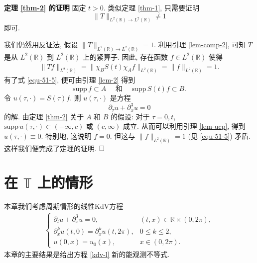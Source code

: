 \documentclass[master]{cugthesis}
\newcommand\R{\ensuremath{\mathbb{R}}}
\newcommand\T{\ensuremath{\mathbb{T}}}
\begin{document}
{\bf {定理 \ref{thm-2}} 的证明} 固定 $t>0$. 类似定理 \ref{thm-1}, 只需要证明 $$
\|T\|_{L^2(\R)\to L^2(\R)}\neq 1
$$
即可.

我们仍然用反证法, 假设 $\|T\|_{L^2(\R)\to L^2(\R)}= 1$. 利用引理 \ref{lem-comp-2}, 可知 $T$ 是从 $L^2(\R)$ 到 $L^2(\R)$ 上的紧算子. 因此, 存在函数 $f\in L^2(\R)$ 使得
\begin{align}\label{equ-51-5}
\|Tf\|_{L^2(\R)}=\|\chi_BS(t)\chi_Af\|_{L^2(\R)}=\|f\|_{L^2(\R)}=1.
\end{align}
有了式 \eqref{equ-51-5}, 便可由引理 \ref{lem-2} 得到
$$\mathrm{supp }\, f\subset A\quad \text{ 和 }\quad \mathrm{supp }\, S(t)f \subset B.$$
令 $u(\tau,\cdot)=S(\tau)f$. 则 $u(\tau,\cdot)$ 是方程
$$
\partial_\tau u+\partial_x^3u=0
$$
的解.
由定理 \ref{thm-2} 关于 $A$ 和 $B$ 的假设: 对于 $\tau=0,t$, $\mathrm{supp }\,u(\tau,\cdot)\subset (-\infty,c)$ 或 $(c,\infty)$ 成立. 从而可以利用引理 \ref{lem-ucp}, 得到 $u(\tau,\cdot)\equiv 0$. 特别地, 这说明 $f=0$. 但这与 $\|f\|_{L^2(\R)}=1$ (见 \eqref{equ-51-5}) 矛盾. 这样我们便完成了定理的证明. $\hfill\Box$
%
   
    \chapter{在 $\T$ 上的情形}
    
     本章我们考虑周期情形的线性KdV方程
    \begin{align}\label{kdv-l}
        \left\lbrace \begin{array}{ll}\partial_t u +\partial_x^3u=0, & (t,x)\in \R\times (0,2\pi), \\
        \partial_x^ku(t,0)=\partial_x^k u(t,2\pi), & 0\le k\le 2,\\
        u(0,x)=u_0(x), & x\in (0,2\pi).
        \end{array}\right.
    \end{align}
    本章的主要结果是给出方程 \eqref{kdv-l} 新的能观测不等式.
\end{document}
